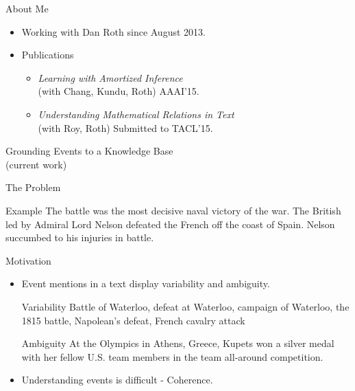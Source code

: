 \begin{frame}{About Me}
  \begin{itemize}[<+->]
  \item Working with Dan Roth since August 2013.
  \item Publications
    \begin{itemize}[<+->]
    \item \emph{Learning with Amortized Inference} \\
      (with Chang, Kundu, Roth) AAAI'15.
    \item \emph{Understanding Mathematical Relations in Text} \\
      (with Roy, Roth) Submitted to TACL'15.
      \end{itemize}
  \end{itemize}
\end{frame}

\begin{frame}
  \begin{center}
    {
      \huge Grounding Events to a Knowledge Base
    } \\
    (current work)
  \end{center}
\end{frame}


\begin{frame}{The Problem}

  \begin{exampleblock}{Example}
      {The { battle} was the most decisive naval victory of the {war}}. The British led by Admiral Lord Nelson defeated the French off the coast of Spain. Nelson succumbed to his injuries in battle.
      \end{exampleblock}
  \end{frame}
\begin{frame}{Motivation}
  \begin{itemize}[<+->]
  \item Event mentions in a text display variability and ambiguity.
    \begin{exampleblock}{Variability}
      {Battle of Waterloo, defeat at Waterloo, campaign of Waterloo, the 1815 battle, Napolean's defeat, French cavalry attack}
    \end{exampleblock}
    \begin{exampleblock}{Ambiguity}
     At the { Olympics } in Athens, Greece, Kupets won a silver medal with her fellow U.S. team members in the team all-around competition.
    \end{exampleblock}
  \item Understanding events is difficult - Coherence.
  \end{itemize}
\end{frame}

